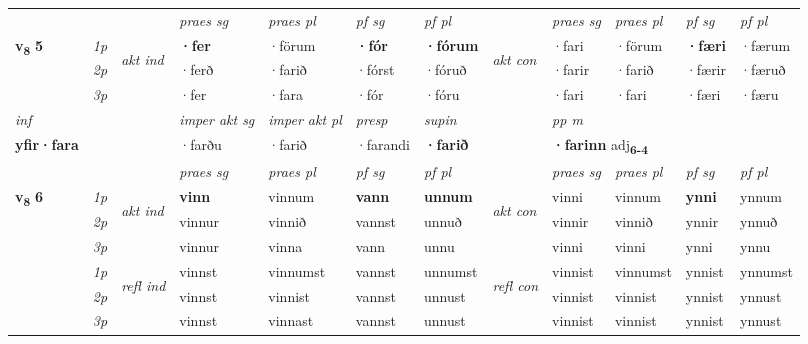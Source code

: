 \begin{longtable}[l]{X>{\footnotesize\itshape}llXXXXlXXXX}
 & &   & \textit{praes sg}  & \textit{praes pl}    & \textit{ pf sg} & \textit{pf pl} & & \textit{praes sg}  & \textit{praes pl}    & \textit{pf sg} & \textit{pf pl }  \\ \cmidrule{4-7} \cmidrule{9-12}
 \multirow{2}{*}{{{\textbf{v{\textsubscript{8}}} \Large{\textbf{5}}}}}  & 1p & \multirow{3}{*}{\begin{turn}{90}\textit{akt ind}\end{turn}} & \textbf{·fer} & ·förum & \textbf{·fór} & \textbf{·fórum} & \multirow{3}{*}{\begin{turn}{90}\textit{akt con}\end{turn}} &·fari & ·förum & \textbf{·færi} & ·færum\\*
 & 2p &  &  ·ferð  & ·farið & ·fórst & ·fóruð & & ·farir & ·farið & ·færir & ·færuð \\*
 & 3p &  & ·fer & ·fara & ·fór & ·fóru & & ·fari & ·fari& ·færi & ·færu \\*
\cmidrule{4-7} \cmidrule{9-12}

   {\textit{inf}} & &  & \textit{imper akt sg} & \textit{imper akt pl}   & \textit{presp} & \textit{supin}  && \textit{pp m} \\*
  {\textbf{yfir\allowbreak ·fara}} & && ·farðu  & ·farið   & ·farandi &  \textbf{·farið}  && \multicolumn{2}{l}{\textbf{·farinn} adj\textbf{\textsubscript{6-4}}} \\*

\midrule

 & &   & \textit{praes sg}  & \textit{praes pl}    & \textit{ pf sg} & \textit{pf pl} & & \textit{praes sg}  & \textit{praes pl}    & \textit{pf sg} & \textit{pf pl }  \\ \cmidrule{4-7} \cmidrule{9-12}
 \multirow{2}{*}{{{\textbf{v{\textsubscript{8}}} \Large{\textbf{6}}}}}  & 1p & \multirow{3}{*}{\begin{turn}{90}\textit{akt ind}\end{turn}} & \textbf{vinn} & vinnum & \textbf{vann} & \textbf{unnum} & \multirow{3}{*}{\begin{turn}{90}\textit{akt con}\end{turn}} &vinni & vinnum & \textbf{ynni} & ynnum\\*
 & 2p &  &  vinnur  & vinnið & vannst & unnuð & & vinnir & vinnið & ynnir & ynnuð \\*
 & 3p &  & vinnur & vinna & vann & unnu & & vinni & vinni& ynni & ynnu \\*
\cmidrule{4-7} \cmidrule{9-12}
 & 1p & \multirow{3}{*}{\begin{turn}{90}\textit{refl ind}\end{turn}}  & vinnst & vinnumst & vannst & unnumst & \multirow{3}{*}{\begin{turn}{90}\textit{refl con}\end{turn}}  &vinnist & vinnumst & ynnist & ynnumst \\*
 & 2p &  & vinnst & vinnist & vannst & unnust & &vinnist & vinnist & ynnist & ynnust \\*
 & 3p  & & vinnst & vinnast & vannst & unnust & & vinnist & vinnist& ynnist & ynnust \\*
\cmidrule{4-7} \cmidrule{9-12}


\end{longtable}
